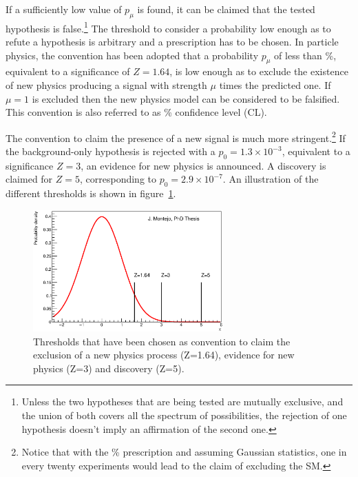     If a sufficiently low value of $p_\mu$ is found, it can be claimed that the tested hypothesis is false.\footnote{
    Unless the two hypotheses that are being tested are mutually exclusive, and the union of both covers all the spectrum of possibilities, the rejection of one hypothesis doesn't imply an affirmation of the second one.}
    The threshold to consider a probability low enough as to refute a hypothesis is arbitrary and a prescription has to be chosen.
    In particle physics, the convention has been adopted that a probability $p_\mu$ of less than \unit[5]{\%}, equivalent to a significance of $Z=1.64$, is low enough
    as to exclude the existence of new physics producing a signal with strength $\mu$ times the predicted one. If $\mu=1$ is excluded then the new physics model can be considered to be falsified. This convention is also referred to as \unit[95]{\%} confidence level (CL).

    The convention to claim the presence of a new signal is much more stringent.\footnote{
      Notice that with the \unit[5]{\%} prescription and assuming Gaussian statistics, 
    one in every twenty experiments would lead to the claim of excluding the SM.}
    If the background-only hypothesis is rejected with a $p_0=1.3\times 10^{-3}$, equivalent to a significance $Z=3$,
    an evidence for new physics is announced. A discovery is claimed for $Z=5$, corresponding to $p_0=2.9\times 10^{-7}$. An illustration of the different thresholds is shown in figure~\ref{fig:significance}.
    \begin{figure}[tb!]
      \centering
      \includegraphics[width=0.65\textwidth]{Statistics/Figures/significance}
      \caption{Thresholds that have been chosen as convention to claim the exclusion of a new physics process (Z=1.64), evidence for new physics (Z=3) and discovery (Z=5).}
      \label{fig:significance}
    \end{figure}

